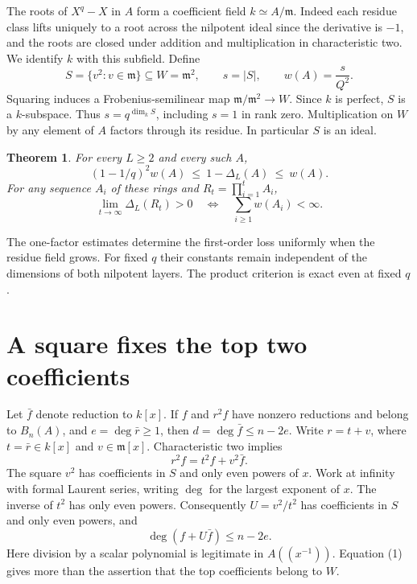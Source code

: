 \documentclass[11pt]{article}
\newtheorem{theorem}{Theorem}
\newcommand{\m}{\mathfrak m}
\begin{document}
The roots of $X^q-X$ in $A$ form a coefficient field $k\simeq A/\m$. Indeed each residue class lifts uniquely to a root across the nilpotent ideal since the derivative is $-1$, and the roots are closed under addition and multiplication in characteristic two. We identify $k$ with this subfield. Define
\[
 S=\{v^2:v\in\m\}\subseteq W=\m^2,\qquad
 s=|S|,\qquad w(A)=\frac{s}{Q^2}.
\]
Squaring induces a Frobenius-semilinear map $\m/\m^2\to W$. Since $k$ is perfect, $S$ is a $k$-subspace. Thus $s=q^{\dim_k S}$, including $s=1$ in rank zero. Multiplication on $W$ by any element of $A$ factors through its residue. In particular $S$ is an ideal.

\begin{theorem}\label{th:main}
For every $L\ge2$ and every such $A$,
\[
        (1-1/q)^2w(A)\ \le\ 1-\Delta_L(A)\ \le\ w(A).
\]
For any sequence $A_i$ of these rings and $R_t=\prod_{i=1}^t A_i$,
\[
 \lim_{t\to\infty}\Delta_L(R_t)>0
       \quad\Longleftrightarrow\quad
              \sum_{i\ge1}w(A_i)<\infty .
\]
\end{theorem}

The one-factor estimates determine the first-order loss uniformly when the residue field grows. For fixed $q$ their constants remain independent of the dimensions of both nilpotent layers. The product criterion is exact even at fixed $q$.

\section{A square fixes the top two coefficients}

Let $\bar f$ denote reduction to $k[x]$. If $f$ and $r^2f$ have nonzero reductions and belong to $B_n(A)$, and $e=\deg\bar r\ge1$, then $d=\deg\bar f\le n-2e$. Write $r=t+v$, where $t=\bar r\in k[x]$ and $v\in\m[x]$. Characteristic two implies
\[
          r^2f=t^2f+v^2\bar f.
\]
The square $v^2$ has coefficients in $S$ and only even powers of $x$. Work at infinity with formal Laurent series, writing $\deg$ for the largest exponent of $x$. The inverse of $t^2$ has only even powers. Consequently $U=v^2/t^2$ has coefficients in $S$ and only even powers, and
\[
            \deg(f+U\bar f)\le n-2e.             \tag{1}
\]
Here division by a scalar polynomial is legitimate in $A((x^{-1}))$. Equation (1) gives more than the assertion that the top coefficients belong to $W$.
\end{document}
